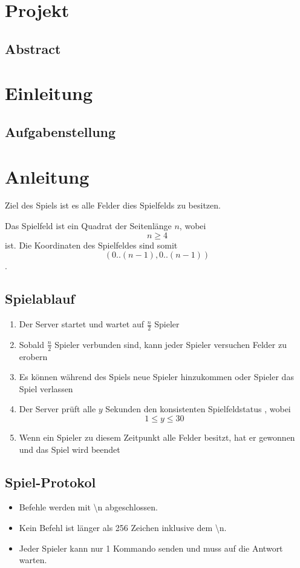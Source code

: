 \chapter{Projekt}

\section{Abstract}
\label{abstract}


\chapter{Einleitung}


\section{Aufgabenstellung}

\chapter{Anleitung}
Ziel des Spiels ist es alle Felder dies Spielfelds zu besitzen.

Das Spielfeld ist ein Quadrat der Seitenlänge $n$, wobei $$n \geq  4$$ ist. Die Koordinaten des Spielfeldes sind somit $$(0..(n-1), 0..(n-1))$$.

\section{Spielablauf}
\begin{enumerate}
	\item Der Server startet und wartet auf $\frac{n}{2}$ Spieler
	\item Sobald $\frac{n}{2}$ Spieler verbunden sind, kann jeder Spieler versuchen Felder zu erobern
	\item Es können während des Spiels neue Spieler hinzukommen oder Spieler das Spiel verlassen
	\item Der Server prüft alle $y$ Sekunden den konsistenten Spielfeldstatus , wobei $$1 \leq y \leq 30$$
	\item Wenn ein Spieler zu diesem Zeitpunkt alle Felder besitzt, hat er gewonnen und das Spiel wird beendet
\end{enumerate}

\section{Spiel-Protokol}
\begin{itemize}
	\item Befehle werden mit \textbackslash n abgeschlossen.
	\item Kein Befehl ist länger als 256 Zeichen inklusive dem \textbackslash n.
	\item Jeder Spieler kann nur 1 Kommando senden und muss auf die Antwort warten.
\end{itemize}

